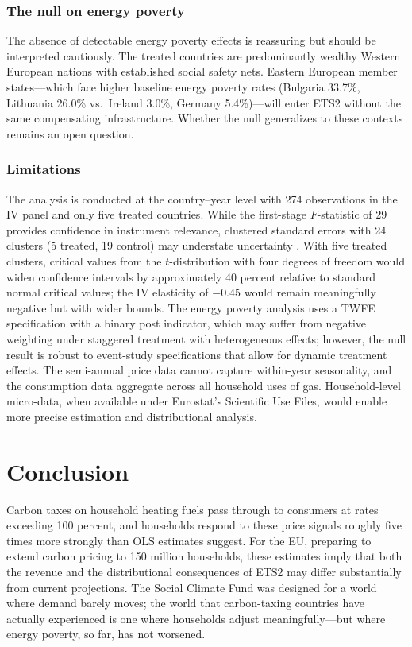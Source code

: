 \documentclass[12pt]{article}
\begin{document}
\subsubsection*{The null on energy poverty} The absence of detectable energy poverty effects is reassuring but should be interpreted cautiously. The treated countries are predominantly wealthy Western European nations with established social safety nets. Eastern European member states---which face higher baseline energy poverty rates (Bulgaria 33.7\%, Lithuania 26.0\% vs.\ Ireland 3.0\%, Germany 5.4\%)---will enter ETS2 without the same compensating infrastructure. Whether the null generalizes to these contexts remains an open question.

\subsubsection*{Limitations} The analysis is conducted at the country--year level with 274 observations in the IV panel and only five treated countries. While the first-stage $F$-statistic of 29 provides confidence in instrument relevance, clustered standard errors with 24 clusters (5 treated, 19 control) may understate uncertainty \citep{cameron2015practitioners}. With five treated clusters, critical values from the $t$-distribution with four degrees of freedom would widen confidence intervals by approximately 40 percent relative to standard normal critical values; the IV elasticity of $-0.45$ would remain meaningfully negative but with wider bounds. The energy poverty analysis uses a TWFE specification with a binary post indicator, which may suffer from negative weighting under staggered treatment with heterogeneous effects; however, the null result is robust to event-study specifications that allow for dynamic treatment effects. The semi-annual price data cannot capture within-year seasonality, and the consumption data aggregate across all household uses of gas. Household-level micro-data, when available under Eurostat's Scientific Use Files, would enable more precise estimation and distributional analysis.


\section{Conclusion}

Carbon taxes on household heating fuels pass through to consumers at rates exceeding 100 percent, and households respond to these price signals roughly five times more strongly than OLS estimates suggest. For the EU, preparing to extend carbon pricing to 150 million households, these estimates imply that both the revenue and the distributional consequences of ETS2 may differ substantially from current projections. The Social Climate Fund was designed for a world where demand barely moves; the world that carbon-taxing countries have actually experienced is one where households adjust meaningfully---but where energy poverty, so far, has not worsened.
\end{document}
